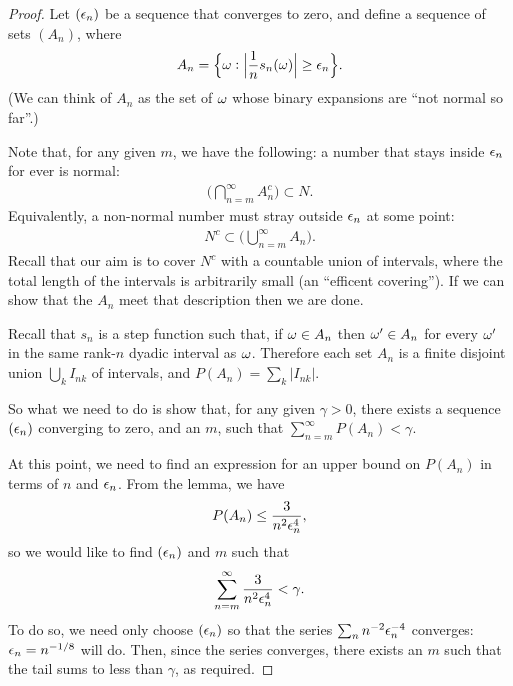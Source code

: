 \begin{proof}
  Let $(\epsilon_n)$ be a sequence that converges to zero, and define a sequence of sets $(A_n)$, where
  \begin{align*}
    A_n = \Big\{\omega : \Big|\frac{1}{n} s_n(\omega)\Big| \geq \epsilon_n\Big\}.
  \end{align*}
  (We can think of $A_n$ as the set of $\omega$ whose binary expansions are ``not normal so far​''.)

  Note that, for any given $m$, we have the following: a number that stays inside $\epsilon_n$ for ever is normal:
  \begin{align*}
    \Big(\bigcap_{n=m}^\infty A_n^c\Big) \subset N.
  \end{align*}
  Equivalently, a non-normal number must stray outside $\epsilon_n$ at some point:
  \begin{align*}
    N^c \subset \Big(\bigcup_{n=m}^\infty A_n\Big).
  \end{align*}
  Recall that our aim is to cover $N^c$ with a countable union of intervals, where the total length of the
  intervals is arbitrarily small (an ``efficent covering​​''). If we can show that the $A_n$ meet that
  description then we are done.

  Recall that $s_n$ is a step function such that, if $\omega \in A_n$ then $\omega' \in A_n$ for every $\omega'$ in the
  same rank-$n$ dyadic interval as $\omega$. Therefore each set $A_n$ is a finite disjoint
  union $\bigcup_{k}I_{nk}$ of intervals, and $P(A_n) = \sum_k |I_{nk}|$.

  So what we need to do is show that, for any given $\gamma > 0$, there exists a sequence $(\epsilon_n)$ converging
  to zero, and an $m$, such that $\sum_{n=m}^\infty P(A_n) < \gamma$.

  At this point, we need to find an expression for an upper bound on $P(A_n)$ in terms of $n$ and $\epsilon_n$.
  From the lemma, we have
  \begin{align*}
    P(A_n) \leq \frac{3}{n^2\epsilon_n^4},
  \end{align*}
  so we would like to find $(\epsilon_n)$ and $m$ such that
  \begin{align*}
    \sum_{n=m}^\infty \frac{3}{n^2\epsilon_n^4} < \gamma.
  \end{align*}
  To do so, we need only choose $(\epsilon_n)$ so that the series $\sum_nn^{-2}\epsilon_n^{-4}$
  converges: $\epsilon_n = n^{-1/8}$ will do. Then, since the series converges, there exists an $m$ such that the
  tail sums to less than $\gamma$, as required.
\end{proof}

